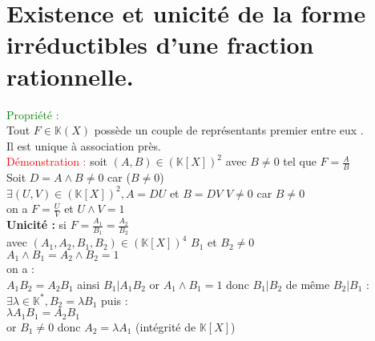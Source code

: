 \documentclass{article}
\begin{document}
\section{Existence et unicité de la forme irréductibles d'une fraction rationnelle.}
\textcolor{green}{Propriété :} \\
Tout $F \in \mathbb K (X)$ possède un couple de représentants premier entre eux . \\
Il est unique à association près. \\
\textcolor{red}{Démonstration :} soit $(A,B) \in (\mathbb K[X])^2$ avec $B \neq 0$ tel que $F=\frac{A}{B}$ \\
Soit $D=A \wedge B \neq 0$ car ($B \neq 0$) \\
$\exists (U,V) \in (\mathbb K [X])^2, A=DU$ et $B=DV$ $V \neq 0$ car $B \neq 0$ \\
on a $F= \frac{U}{V}$ et $U \wedge V=1$ \\
{\bf Unicité :} si $F=\frac{A_1}{B_1}=\frac{A_2}{B_2}$ \\
avec $(A_1,A_2,B_1,B_2) \in (\mathbb K [X])^4$ $B_1$ et $B_2 \neq 0$ \\
$A_1 \wedge B_1= A_2 \wedge B_2=1$ \\
on a : \\
$A_1B_2=A_2B_1$ ainsi $B_1|A_1B_2$ or $A_1 \wedge B_1=1$ donc $B_1|B_2$ de même $B_2|B_1$ :\\
$\exists \lambda \in \mathbb K^*,B_2= \lambda B_1$ puis : \\
$\lambda A_1 B_1=A_2B_1$ \\
or $B_1 \neq 0$ donc $A_2= \lambda A_1$ (intégrité de $\mathbb K [X]$)
\end{document}
